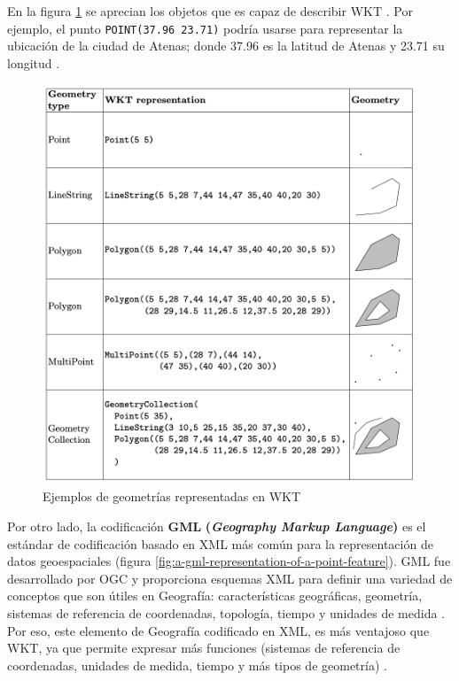 En la figura \ref{fig:wkt} se aprecian los objetos que es capaz de describir WKT \cite{wkt}. Por ejemplo, el punto \texttt{POINT(37.96 23.71)} podría usarse para representar la ubicación de la ciudad de Atenas; donde 37.96 es la latitud de Atenas y 23.71 su longitud \cite{wkt-database}.

\begin{figure}[H]
	\centering
	\includegraphics[width=0.93\linewidth]{imagenes/capitulo2/wkt}
	\caption{Ejemplos de geometrías representadas en WKT \cite{tesis-otro}}
	\label{fig:wkt}
\end{figure}

Por otro lado, la codificación \textbf{GML} \textbf{(\textit{Geography Markup Language})} es el estándar de codificación basado en XML más común para la representación de datos geoespaciales (figura \ref{fig:a-gml-representation-of-a-point-feature}). GML fue desarrollado por OGC y proporciona esquemas XML para definir una variedad de conceptos que son útiles en Geografía: características geográficas, geometría, sistemas de referencia de coordenadas, topología, tiempo y unidades de medida \cite{wkt-database}. Por eso, este elemento de Geografía codificado en XML, es más ventajoso que WKT, ya que permite expresar más funciones (sistemas de referencia de coordenadas, unidades de medida, tiempo y más tipos de geometría) \cite{tesis-otro}. 


